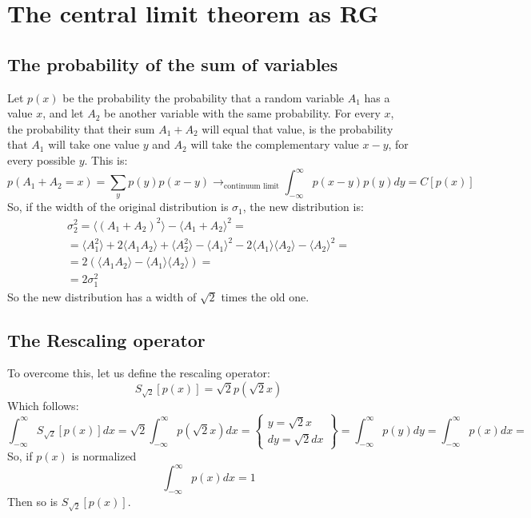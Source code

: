 \documentclass{article}
\begin{document}
\section{The central limit theorem as RG}
\subsection{The probability of the sum of variables}
Let $p(x)$ be the probability the probability that a random variable $A_1$ has a value $x$, and let $A_2$ be another variable with the same probability. For every $x$, the probability that their sum $A_1 + A_2$ will equal that value, is the probability that $A_1$ will take one value $y$ and $A_2$ will take the complementary value $x - y$, for every possible $y$. This is:
\begin{equation}
    p(A_1 + A_2 = x) = \sum_y p(y)p(x-y) \rightarrow_{\text{continuum limit}} \int_{-\infty}^\infty p(x-y)p(y)dy = C[p(x)]
\end{equation}
So, if the width of the original distribution is $\sigma_1$, the new distribution is:
\begin{equation}
\begin{gathered}
    \sigma_2^2 = \langle (A_1 + A_2)^2 \rangle -\langle A_1 + A_2 \rangle^2 = \\ =
    \langle A_1^2 \rangle + 2\langle A_1A_2 \rangle + \langle A_2^2 \rangle - \langle A_1 \rangle^2 - 2\langle A_1 \rangle\langle A_2 \rangle - \langle A_2 \rangle^2 = \\ =
    2\left(\langle A_1A_2 \rangle - \langle A_1 \rangle\langle A_2 \rangle\right) = \\ = 2\sigma_1^2
\end{gathered}
\end{equation}
So the new distribution has a width of $\sqrt{2}$ times the old one.
\subsection{The Rescaling operator}
To overcome this, let us define the rescaling operator:
\begin{equation}
    S_{\sqrt{2}}\left[p(x)\right] = \sqrt{2}p(\sqrt{2}x)
\end{equation}
Which follows:
\begin{equation}
    \int_{-\infty}^\infty S_{\sqrt{2}}\left[p(x)\right] dx = 
    \sqrt{2} \int_{-\infty}^\infty p(\sqrt{2}x) dx = \left\{
        \begin{matrix}
            y = \sqrt{2}x \\ dy = \sqrt{2}dx
        \end{matrix}
    \right\} =
    \int_{-\infty}^\infty p(y) dy = \int_{-\infty}^\infty p(x) dx = 
\end{equation}
So, if $p(x)$ is normalized
\begin{equation}
    \int_{-\infty}^\infty p(x) dx = 1
\end{equation}
Then so is $S_{\sqrt{2}}\left[p(x)\right]$.
\end{document}
